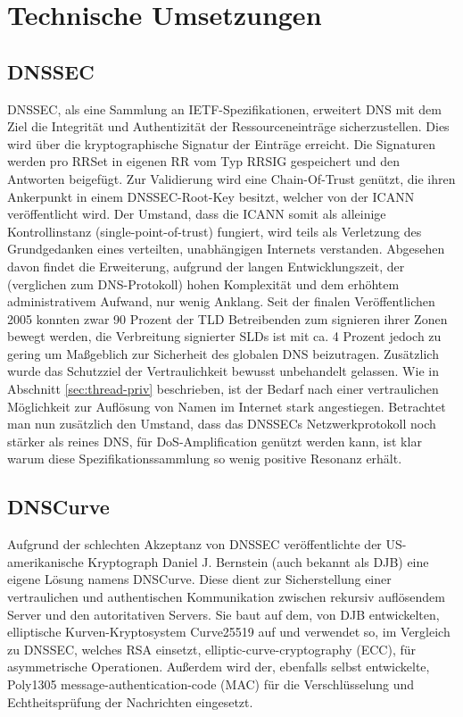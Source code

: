\chapter{Technische Umsetzungen}
\label{chap:technologies}

\section{DNSSEC}
\label{sec:tec-dnssec}
DNSSEC, als eine Sammlung an IETF-Spezifikationen, erweitert DNS mit dem Ziel die Integrität und Authentizität der Ressourceneinträge sicherzustellen\cite{Arends2005}. Dies wird über die kryptographische Signatur der Einträge erreicht. Die Signaturen werden pro RRSet in eigenen RR vom Typ RRSIG gespeichert und den Antworten beigefügt. Zur Validierung wird eine Chain-Of-Trust genützt, die ihren Ankerpunkt in einem DNSSEC-Root-Key besitzt, welcher von der ICANN veröffentlicht wird. Der Umstand, dass die ICANN somit als alleinige Kontrollinstanz (single-point-of-trust) fungiert, wird teils als Verletzung des Grundgedanken eines verteilten, unabhängigen Internets verstanden\cite{Finch2014}.
Abgesehen davon findet die Erweiterung, aufgrund der langen Entwicklungszeit, der (verglichen zum DNS-Protokoll) hohen Komplexität und dem erhöhtem administrativem Aufwand, nur wenig Anklang. Seit der finalen Veröffentlichen 2005 konnten zwar 90 Prozent der TLD Betreibenden zum signieren ihrer Zonen bewegt werden, die Verbreitung signierter SLDs ist mit ca. 4 Prozent jedoch zu gering um Maßgeblich zur Sicherheit des globalen DNS beizutragen\cite{DCCommunications2018}. Zusätzlich wurde das Schutzziel der Vertraulichkeit bewusst unbehandelt gelassen. Wie in Abschnitt \ref{sec:thread-priv} beschrieben, ist der Bedarf nach einer vertraulichen Möglichkeit zur Auflösung von Namen im Internet stark angestiegen. Betrachtet man nun zusätzlich den Umstand, dass das DNSSECs Netzwerkprotokoll noch stärker als reines DNS, für DoS-Amplification genützt werden kann, ist klar warum diese Spezifikationssammlung so wenig positive Resonanz erhält\cite{Antic2014}.

\section{DNSCurve}
\label{sec:tec-dnscurve}
Aufgrund der schlechten Akzeptanz von DNSSEC veröffentlichte der US-amerikanische Kryptograph Daniel J. Bernstein (auch bekannt als DJB) eine eigene Lösung namens DNSCurve. Diese dient zur Sicherstellung einer vertraulichen und authentischen Kommunikation zwischen rekursiv auflösendem Server und den autoritativen Servers. Sie baut auf dem, von DJB entwickelten, elliptische Kurven-Kryptosystem Curve25519 auf und verwendet so, im Vergleich zu DNSSEC, welches RSA einsetzt, elliptic-curve-cryptography (ECC), für asymmetrische Operationen. Außerdem wird der, ebenfalls selbst entwickelte, Poly1305 message-authentication-code (MAC) für die Verschlüsselung und Echtheitsprüfung der Nachrichten eingesetzt. 

